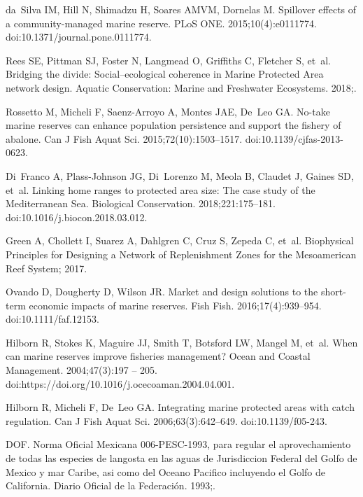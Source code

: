 \documentclass[10pt,letterpaper]{article}
\begin{document}
\begin{thebibliography}{10}
da~Silva IM, Hill N, Shimadzu H, Soares AMVM, Dornelas M.
\newblock Spillover effects of a community-managed marine reserve.
\newblock PLoS ONE. 2015;10(4):e0111774.
\newblock doi:{10.1371/journal.pone.0111774}.

Rees SE, Pittman SJ, Foster N, Langmead O, Griffiths C, Fletcher S, et~al.
\newblock Bridging the divide: Social–ecological coherence in Marine
  Protected Area network design.
\newblock Aquatic Conservation: Marine and Freshwater Ecosystems. 2018;.

Rossetto M, Micheli F, Saenz-Arroyo A, Montes JAE, De~Leo GA.
\newblock No-take marine reserves can enhance population persistence and
  support the fishery of abalone.
\newblock Can J Fish Aquat Sci. 2015;72(10):1503--1517.
\newblock doi:{10.1139/cjfas-2013-0623}.

Di~Franco A, Plass-Johnson JG, Di~Lorenzo M, Meola B, Claudet J, Gaines SD,
  et~al.
\newblock Linking home ranges to protected area size: The case study of the
  Mediterranean Sea.
\newblock Biological Conservation. 2018;221:175--181.
\newblock doi:{10.1016/j.biocon.2018.03.012}.

Green A, Chollett I, Suarez A, Dahlgren C, Cruz S, Zepeda C, et~al.
\newblock Biophysical Principles for Designing a Network of Replenishment Zones
  for the Mesoamerican Reef System; 2017.

Ovando D, Dougherty D, Wilson JR.
\newblock Market and design solutions to the short-term economic impacts of
  marine reserves.
\newblock Fish Fish. 2016;17(4):939--954.
\newblock doi:{10.1111/faf.12153}.

Hilborn R, Stokes K, Maguire JJ, Smith T, Botsford LW, Mangel M, et~al.
\newblock When can marine reserves improve fisheries management?
\newblock Ocean and Coastal Management. 2004;47(3):197 -- 205.
\newblock doi:{https://doi.org/10.1016/j.ocecoaman.2004.04.001}.

Hilborn R, Micheli F, De~Leo GA.
\newblock Integrating marine protected areas with catch regulation.
\newblock Can J Fish Aquat Sci. 2006;63(3):642--649.
\newblock doi:{10.1139/f05-243}.

DOF.
\newblock Norma Oficial Mexicana 006-PESC-1993, para regular el aprovechamiento
  de todas las especies de langosta en las aguas de Jurisdiccion Federal del
  Golfo de Mexico y mar Caribe, asi como del Oceano Pacifico incluyendo el
  Golfo de California.
\newblock Diario Oficial de la Federación. 1993;.


\end{thebibliography}
\end{document}
